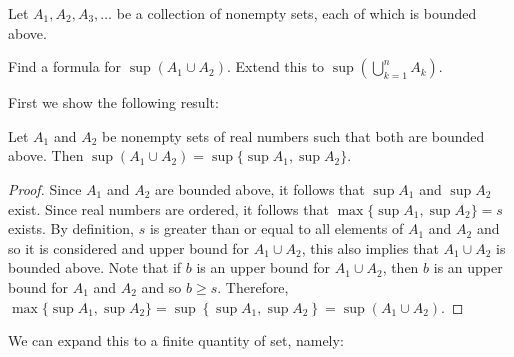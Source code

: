 \documentclass[12pt]{article}
\newenvironment{lemma}[2][Lemma]{\begin{trivlist}
		\item[\hskip \labelsep {\bfseries #1}\hskip \labelsep {\bfseries #2.}]}{\end{trivlist}}
\newenvironment{problem}[2][Problem]{\begin{trivlist}
		\item[\hskip \labelsep {\bfseries #1}\hskip \labelsep {\bfseries #2.}]}{\end{trivlist}}
\newenvironment{solution}[2][Solution]{\begin{trivlist}
		\item[\hskip \labelsep {\bfseries #1}\hskip \labelsep {\bfseries #2.}]}{\end{trivlist}}
\begin{document}
		\begin{problem}{1.3.4}
			Let $A_{1},A_{2},A_{3},\ldots$ be a collection of nonempty sets, each of which is bounded above.
			\begin{enumerate}[label=(\alph*)]
				\item Find a formula for $\sup(A_{1}\cup A_{2})$. Extend this to $\sup\left(\bigcup_{k=1}^{n}A_{k}\right)$.
				\begin{solution}{(a)}
				First we show the following result:
				\begin{lemma}{1}
				Let $A_{1}$ and $A_{2}$ be nonempty sets of real numbers such that both are bounded above. Then $\sup (A_{1}\cup A_{2}) = \sup\{\sup A_{1}, \sup A_{2}\}$.
				\begin{proof}
				 Since $A_{1}$ and $A_{2}$ are bounded above, it follows that $\sup A_{1}$ and $\sup A_{2}$ exist. Since real numbers are ordered, it follows that $\max\{\sup A_{1},\sup A_{2}\} = s$ exists. By definition, $s$ is greater than or equal to all elements of $A_{1}$ and $A_{2}$ and so it is considered and upper bound for $A_{1}\cup A_{2}$, this also implies that $A_{1}\cup A_{2}$ is bounded above. Note that if $b$ is an upper bound for $A_{1}\cup A_{2}$, then $b$ is an upper bound for $A_{1}$ and $A_{2}$ and so $b\geq s$. Therefore, $\max\{\sup A_{1},\sup A_{2}\} = \sup \left\{\sup A_{1},\sup A_{2}\right\} = \sup (A_{1}\cup A_{2})$.
				 \end{proof}
				 \end{lemma}
					
					We can expand this to a finite quantity of set, namely:
					

\end{solution}
\end{enumerate}
\end{problem}
\end{document}
